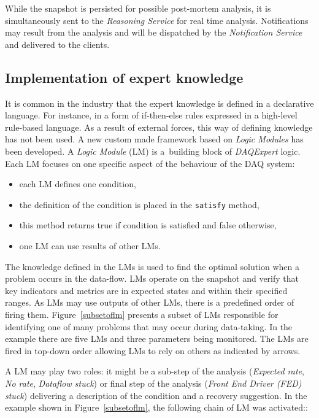 \documentclass[a4paper]{jpconf}
\begin{document}
While the snapshot is persisted for possible post-mortem analysis, it is simultaneously sent to the {\it Reasoning Service} for real time analysis. Notifications may result from the analysis and will be dispatched by the {\it Notification Service} and delivered to the clients.


\subsection{Implementation of expert knowledge}
It is common in the industry that the expert knowledge is defined in a declarative language. For instance, in a form of if-then-else rules expressed in a high-level rule-based language. As a result of external forces, this way of defining knowledge has not been used. A new custom made framework based on {\it Logic Modules} has been developed. A {\it Logic Module} (LM) is a~building block of {\it DAQExpert} logic. Each LM focuses on one specific aspect of the behaviour of the DAQ system:


\begin{itemize}
\itemsep0em
\item each LM defines one condition,
\item the definition of the condition is placed in the {\tt satisfy} method,
\item this method returns true if condition is satisfied and false otherwise,
\item one LM can use results of other LMs.
\end{itemize}

The knowledge defined in the LMs is used to find the optimal solution when a problem occurs in the data-flow. LMs operate on the snapshot and verify that key indicators and metrics are in expected states and within their specified ranges. As LMs may use outputs of other LMs, there is a predefined order of firing them. Figure~\ref{subsetoflm} presents a subset of LMs responsible for identifying one of many problems that may occur during data-taking. In the example there are five LMs and three parameters being monitored. The LMs are fired in top-down order allowing LMs to rely on others as indicated by arrows.


A LM may play two roles: it might be a sub-step of the analysis ({\it Expected rate}, {\it No rate}, {\it Dataflow stuck}) or final step of the analysis ({\it Front End Driver (FED) stuck}) delivering a description of the condition and a recovery suggestion. In the example shown in Figure~\ref{subsetoflm}, the following chain of LM was activated::
\end{document}
